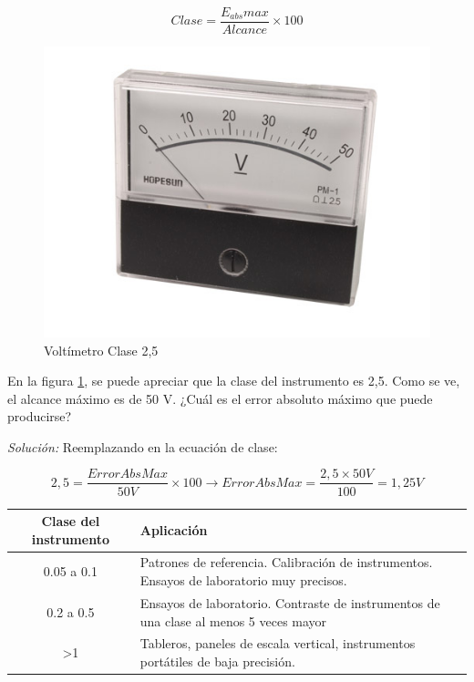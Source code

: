 $$ Clase = \frac{E_{abs}max}{Alcance}\times 100 $$
\begin{figure}
	\includegraphics[scale=0.7]{images/volt_clase}
	\caption{Voltímetro Clase 2,5}
	\label{fig:voltclase}
\end{figure}
\begin{ejemplo}
	En la figura \ref{fig:voltclase}, se puede apreciar que la clase del instrumento es 2,5. Como se ve, el alcance máximo es de 50 V. ¿Cuál es el error absoluto máximo que puede producirse?
	
	\emph{Solución:} Reemplazando en la ecuación de clase:
	
	$$ 2,5 = \frac{ErrorAbsMax}{50 V} \times 100 
	\rightarrow
	ErrorAbsMax = \frac{2,5 \times 50V}{100} = 1,25 V $$
	
	
\end{ejemplo}

\begin{tabular}{|c|p{7cm}|}
\hline 
Clase del instrumento & Aplicación \\ 
\hline 
0.05 a 0.1 & Patrones de referencia. Calibración de instrumentos. Ensayos de laboratorio muy precisos. \\ 
\hline 
0.2 a 0.5 & Ensayos de laboratorio. Contraste de instrumentos de una clase al menos 5 veces mayor \\ 
\hline 
>1 & Tableros, paneles de escala vertical, instrumentos portátiles de baja precisión. \\ 
\hline 
\end{tabular} 
